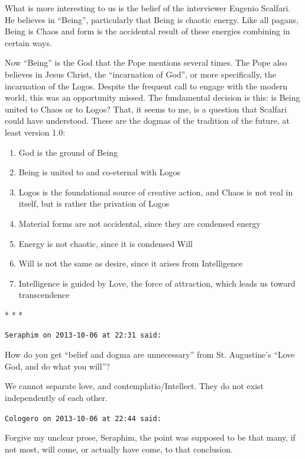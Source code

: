 What is more interesting to us is the belief of the interviewer Eugenio Scalfari. He believes in ``Being'', particularly that Being is chaotic energy. Like all pagans, Being is Chaos and form is the accidental result of these energies combining in certain ways.

Now ``Being'' is the God that the Pope mentions several times. The Pope also believes in Jesus Christ, the ``incarnation of God'', or more specifically, the incarnation of the Logos. Despite the frequent call to engage with the modern world, this was an opportunity missed. The fundamental decision is this: is Being united to Chaos or to Logos? That, it seems to me, is a question that Scalfari could have understood. These are the dogmas of the tradition of the future, at least version 1.0:

\begin{enumerate}


\item God is the ground of Being

\item Being is united to and co-eternal with Logos

\item Logos is the foundational source of creative action, and Chaos is not real in itself, but is rather the privation of Logos

\item Material forms are not accidental, since they are condensed energy

\item Energy is not chaotic, since it is condensed Will

\item Will is not the same as desire, since it arises from Intelligence

\item Intelligence is guided by Love, the force of attraction, which leads us toward transcendence
\end{enumerate}




\begin{center}* * *\end{center}

\begin{footnotesize}
\begin{sffamily}
\texttt{Seraphim on 2013-10-06 at 22:31 said:}

How do you get ``belief and dogma are unnecessary'' from St. Augustine's ``Love God, and do what you will''?

We cannot separate love, and contemplatio/Intellect. They do not exist independently of each other.

\hfill

\texttt{Cologero on 2013-10-06 at 22:44 said:}

Forgive my unclear prose, Seraphim, the point was supposed to be that many, if not most, will come, or actually have come, to that conclusion.


\hfill

\end{sffamily}
\end{footnotesize}

